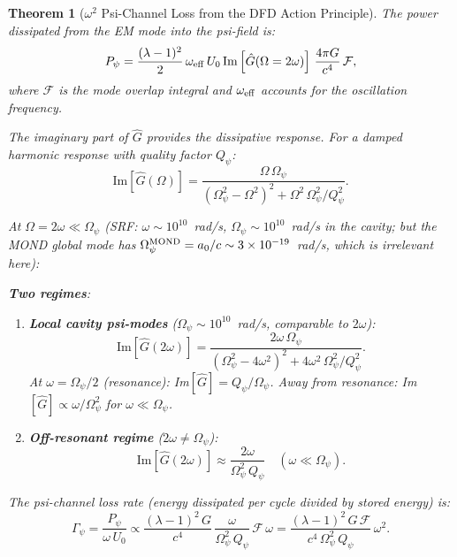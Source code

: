 \documentclass[11pt]{article}
\newcommand{\Opsi}{\Omega_\psi}
\newcommand{\ee}[1]{\times 10^{#1}}
\newcommand{\Qpsi}{Q_\psi}
\newtheorem{theorem}{Theorem}[section]
\theoremstyle{definition}
\theoremstyle{remark}
\begin{document}
\begin{theorem}[$\omega^2$ Psi-Channel Loss from the DFD Action Principle]
The power dissipated from the EM mode into the psi-field is:
\begin{equation}
P_\psi = \frac{(\lambda - 1)^2}{2}\,\omega_{\rm eff}\,U_0\,
\text{Im}\left[\hat{G}(\Omega = 2\omega)\right]\,
\frac{4\pi G}{c^4}\,\mathcal{F},
\label{eq:P_psi_general}
\end{equation}
where $\mathcal{F}$ is the mode overlap integral and $\omega_{\rm eff}$
accounts for the oscillation frequency.

The imaginary part of $\hat{G}$ provides the dissipative response.
For a damped harmonic response with quality factor $\Qpsi$:
\begin{equation}
\text{Im}[\hat{G}(\Omega)] = \frac{\Omega\,\Opsi}{(\Opsi^2 - \Omega^2)^2
+ \Omega^2\,\Opsi^2/\Qpsi^2}.
\label{eq:ImG}
\end{equation}

At $\Omega = 2\omega \ll \Opsi$ (SRF: $\omega \sim 10^{10}$~rad/s,
$\Opsi \sim 10^{10}$~rad/s in the cavity; but the MOND global mode
has $\Opsi^{\rm MOND} = a_0/c \sim 3\ee{-19}$~rad/s, which is
irrelevant here):

\textbf{Two regimes}:
\begin{enumerate}
\item \textbf{Local cavity psi-modes} ($\Opsi \sim 10^{10}$~rad/s,
  comparable to $2\omega$):
  \begin{equation}
  \text{Im}[\hat{G}(2\omega)] = \frac{2\omega\,\Opsi}
  {(\Opsi^2 - 4\omega^2)^2 + 4\omega^2\,\Opsi^2/\Qpsi^2}.
  \end{equation}
  At $\omega = \Opsi/2$ (resonance): Im$[\hat{G}] = \Qpsi/\Opsi$.
  Away from resonance: Im$[\hat{G}] \propto \omega/\Opsi^2$ for
  $\omega \ll \Opsi$.

\item \textbf{Off-resonant regime} ($2\omega \neq \Opsi$):
  \begin{equation}
  \text{Im}[\hat{G}(2\omega)] \approx \frac{2\omega}{\Opsi^2\,\Qpsi}
  \quad (\omega \ll \Opsi).
  \label{eq:ImG_offres}
  \end{equation}
\end{enumerate}

The psi-channel loss rate (energy dissipated per cycle divided by
stored energy) is:
\begin{equation}
\Gamma_\psi = \frac{P_\psi}{\omega\,U_0}
\propto \frac{(\lambda-1)^2\,G}{c^4}\,\frac{\omega}{\Opsi^2\,\Qpsi}
\,\mathcal{F}\,\omega
= \frac{(\lambda-1)^2\,G\,\mathcal{F}}{c^4\,\Opsi^2\,\Qpsi}\,\omega^2.
\label{eq:Gamma_psi}
\end{equation}


\end{theorem}
\end{document}
